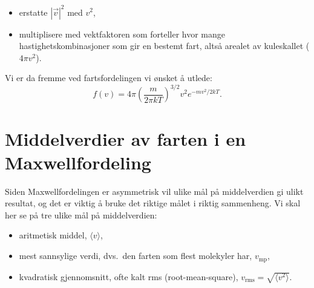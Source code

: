 \begin{itemize}
	\item
	erstatte $|\vec{v}|^2$ med $v^2$,
	\item
	multiplisere med vektfaktoren som forteller hvor mange hastighetskombinasjoner som gir en bestemt fart, altså arealet av kuleskallet ($4\pi v^2$).
\end{itemize}
Vi er da fremme ved fartsfordelingen vi ønsket å utlede:
\begin{displaymath}
	f(v) = 4\pi\left(\frac{m}{2\pi kT}\right)^{3/2} v^2 e^{-mv^2/2kT}.
\end{displaymath}



\section{Middelverdier av farten i en Maxwellfordeling}
\label{apx:maxwellfordeling:middel}
Siden Maxwellfordelingen er asymmetrisk vil ulike mål på middelverdien gi ulikt resultat, og det er viktig å bruke det riktige målet i riktig sammenheng. Vi skal her se på tre ulike mål på middelverdien:
\begin{itemize}
	\item
	aritmetisk middel, $\langle v \rangle$,
	\item
	mest sannsylige verdi, dvs.~den farten som flest molekyler har, $v_\text{mp}$,
	\item
	kvadratisk gjennomsnitt, ofte kalt rms (root-mean-square), $v_\text{rms} = \sqrt{\langle v^2 \rangle}$.
\end{itemize}

